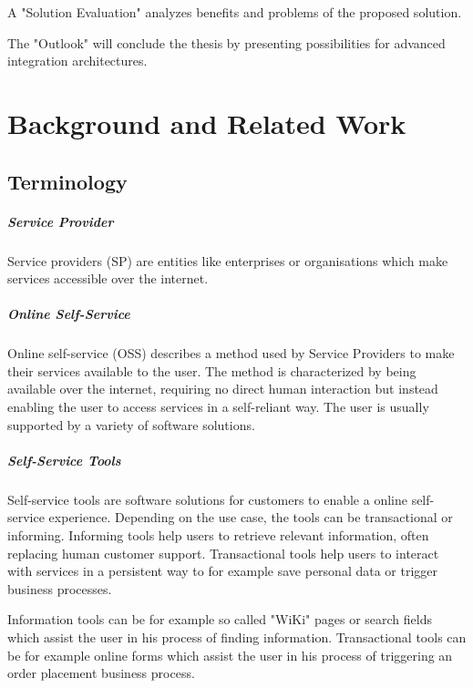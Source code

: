 \documentclass[
     12pt,         %
     a4paper,      %
     BCOR=10mm,version=first,     %
     DIV=14,version=first,        %
     ]{scrreprt}
\begin{document}
A "Solution Evaluation" analyzes benefits and problems of the proposed solution.

The "Outlook" will conclude the thesis by presenting possibilities for advanced integration architectures.

\chapter{Background and Related Work}

\section{Terminology}

\paragraph{Service Provider}
Service providers (SP) are entities like enterprises or organisations which make services accessible over the internet.

\paragraph{Online Self-Service}
Online self-service (OSS) describes a method used by Service Providers to make their services available to the user. The method is characterized by being available over the internet, requiring no direct human interaction but instead enabling the user to access services in a self-reliant way. The user is usually supported by a variety of software solutions.

\paragraph{Self-Service Tools}
Self-service tools are software solutions for customers to enable a online self-service experience. Depending on the use case, the tools can be transactional or informing. Informing tools help users to retrieve relevant information, often replacing human customer support. Transactional tools help users to interact with services in a persistent way to for example save personal data or trigger business processes.

Information tools can be for example so called "WiKi" pages or search fields which assist the user in his process of finding information. Transactional tools can be for example online forms which assist the user in his process of triggering an order placement business process.
\end{document}
